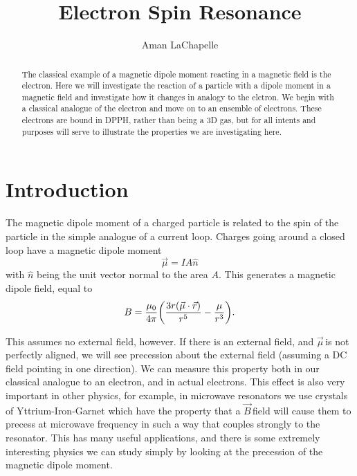 \documentclass{article}
\title{Electron Spin Resonance}
\author{Aman LaChapelle}
\newcommand{\dipole}{$\vec{\mu}\,$}
\newcommand{\B}{$\vec{B}\,$}
\begin{document}
\raggedright
\maketitle

\begin{abstract}
	The classical example of a magnetic dipole moment reacting in a magnetic field is the electron.  Here we will investigate the reaction of a particle with a dipole moment in a magnetic field and investigate how it changes in analogy to the elctron.  We begin with a classical analogue of the electron and move on to an ensemble of electrons.  These electrons are bound in DPPH, rather than being a 3D gas, but for all intents and purposes will serve to illustrate the properties we are investigating here.
\end{abstract}

\tableofcontents
\newpage

\section{Introduction}
	The magnetic dipole moment of a charged particle is related to the spin of the particle in the simple analogue of a current loop.  Charges going around a closed loop have a magnetic dipole moment
	\begin{equation*}
		\vec{\mu} = IA\hat{n}
	\end{equation*}
	with $\hat{n}$ being the unit vector normal to the area $A$.  This generates a magnetic dipole field, equal to
	\begin{equation*}
		B = \frac{\mu_0}{4\pi}\bigg{(}\frac{3r(\vec{\mu} \cdot \vec{r})}{r^5} - \frac{\mu}{r^3}\bigg{)}.
	\end{equation*}

	This assumes no external field, however.  If there is an external field, and \dipole is not perfectly aligned, we will see precession about the external field (assuming a DC field pointing in one direction).  We can measure this property both in our classical analogue to an electron, and in actual electrons.  This effect is also very important in other physics, for example, in microwave resonators we use crystals of Yttrium-Iron-Garnet which have the property that a \B field will cause them to precess at microwave frequency in such a way that couples strongly to the resonator.  This has many useful applications, and there is some extremely interesting physics we can study simply by looking at the precession of the magnetic dipole moment.
\end{document}
